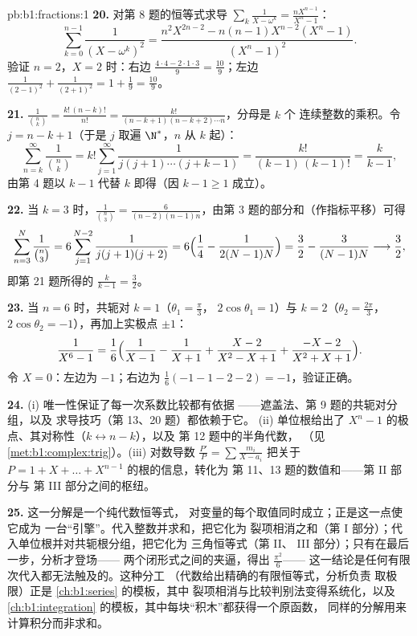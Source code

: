 \begin{solution}{pb:b1:fractions:1}
\textbf{20.} 对第 8 题的恒等式求导
$\sum_k\frac1{X-\omega^k} = \frac{nX^{n-1}}{X^n-1}$：
\[
\sum_{k=0}^{n-1}\frac1{(X - \omega^k)^2}
= \frac{n^2X^{2n-2} - n(n-1)X^{n-2}(X^n - 1)}{(X^n - 1)^2} .
\]
验证 $n = 2$，$X = 2$ 时：右边 $\frac{4\cdot4 -
2\cdot1\cdot3}{9} = \frac{10}9$；左边 $\frac1{(2-1)^2} +
\frac1{(2+1)^2} = 1 + \frac19 = \frac{10}9$。

\textbf{21.} $\frac1{\binom nk} = \frac{k!\,(n-k)!}{n!} =
\frac{k!}{(n-k+1)(n-k+2)\cdots n}$，分母是 $k$ 个
连续整数的乘积。令 $j = n - k + 1$（于是 $j$ 取遍
$\N^*$，$n$ 从 $k$ 起）：
\[
\sum_{n=k}^{\infty}\frac1{\binom nk}
= k!\sum_{j=1}^{\infty}\frac1{j(j+1)\cdots(j+k-1)}
= \frac{k!}{(k-1)\,(k-1)!} = \frac{k}{k-1} ,
\]
由第 4 题以 $k - 1$ 代替 $k$ 即得（因
$k - 1 \geq 1$ 成立）。

\textbf{22.} 当 $k = 3$ 时，$\frac1{\binom n3} =
\frac6{(n-2)(n-1)n}$，由第 3 题的部分和（作指标平移）可得
\[
\sum_{n=3}^{N}\frac1{\binom n3}
= 6\sum_{j=1}^{N-2}\frac1{j(j+1)(j+2)}
= 6\Bigl(\frac14 - \frac1{2(N-1)N}\Bigr)
= \frac32 - \frac3{(N-1)N}
\longrightarrow \frac32 ,
\]
即第 21 题所得的 $\frac k{k-1} = \frac32$。

\textbf{23.} 当 $n = 6$ 时，共轭对 $k = 1$（$\theta_1 = \frac\pi3$，
$2\cos\theta_1 = 1$）与 $k = 2$（$\theta_2 = \frac{2\pi}3$，
$2\cos\theta_2 = -1$），再加上实极点 $\pm1$：
\[
\frac1{X^6-1} = \frac16\Bigl(\frac1{X-1} - \frac1{X+1}
+ \frac{X - 2}{X^2 - X + 1}
+ \frac{-X - 2}{X^2 + X + 1}\Bigr) .
\]
令 $X = 0$：左边为 $-1$；右边为 $\frac16(-1 - 1 - 2 - 2)
= -1$，验证正确。

\textbf{24.} (i) 唯一性保证了每一次系数比较都有依据
——遮盖法、第 9 题的共轭对分组，以及
求导技巧（第 13、20 题）都依赖于它。
(ii) 单位根给出了 $X^n -
1$ 的极点、其对称性（$k \leftrightarrow n-k$），以及
第 12 题中的半角代数，
（见\cref{met:b1:complex:trig}）。(iii) 对数导数
$\frac{P'}P = \sum\frac{m_i}{X-a_i}$ 把关于
$P = 1 + X + \dots + X^{n-1}$ 的根的信息，转化为
第 11、13 题的数值和——第 II 部分与
第 III 部分之间的枢纽。

\textbf{25.} 这一分解是一个纯代数恒等式，
对变量的每个取值同时成立；正是这一点使它成为
一台“引擎”。代入整数并求和，把它化为
裂项相消之和（第 I 部分）；代入单位根并对共轭根分组，把它化为
三角恒等式（第 II、
III 部分）；只有在最后一步，分析才登场——
两个闭形式之间的夹逼，得出 $\frac{\pi^2}6$——
这一结论是任何有限次代入都无法触及的。这种分工
（代数给出精确的有限恒等式，分析负责
取极限）正是 \cref{ch:b1:series} 的模板，其中
裂项相消与比较判别法变得系统化，以及
\cref{ch:b1:integration} 的模板，其中每块“积木”都获得一个原函数，
同样的分解用来计算积分而非求和。
\end{solution}
